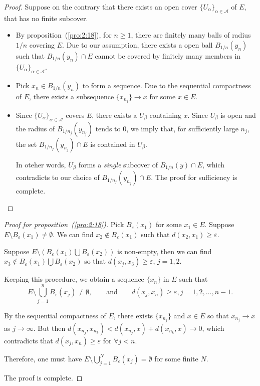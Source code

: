 \begin{proof}
Suppose on the contrary that there exists an open cover $\{U_\alpha\}_{\alpha\in\mathcal{A}}$ of $E$, that has no finite subcover.
\begin{itemize}
\item
By proposition~(\ref{pro:2:18}), for $n\ge1$, there are finitely many balls of radius $1/n$ covering $E$. Due to our assumption, there exists a open ball $B_{1/n}(y_n)$ such that $B_{1/n}(y_n)\cap E$ cannot be covered by finitely many members in $\{U_\alpha\}_{\alpha\in\mathcal{A}}$.
\item
Pick $x_n\in B_{1/n}(y_n)$ to form a sequence. Due to the sequential compactness of $E$, there exists a subsequence $\{x_{n_j}\}\to x$ for some $x\in E$. 
\item
Since $\{U_\alpha\}_{\alpha\in\mathcal{A}}$ covers $E$, there exists a $U_\beta$ containing $x$.
Since $U_\beta$ is open and the radius of $B_{1/n_j}(y_{n_j})$ tends to 0, we imply that,
for sufficiently large $n_j$, the set $B_{1/n_j}(y_{n_j})\cap E$ is contained in $U_\beta$.

In oteher words, $U_\beta$ forms a \emph{single} subcover of $B_{1/n}(y)\cap E$, which contradicts to our choice of $B_{1/n_j}(y_{n_j})\cap E$. 
The proof for sufficiency is complete.
\end{itemize}
\end{proof}
\begin{proof}[Proof for proposition~(\ref{pro:2:18})]
Pick $B_\varepsilon(x_1)$ for some $x_1\in E$. 
Suppose $E\setminus B_\varepsilon(x_1)\ne\emptyset$.
We can find $x_2\notin B_\varepsilon(x_1)$ such that $d(x_2,x_1)\ge\varepsilon$.

Suppose $E\setminus(B_\varepsilon(x_1)\bigcup B_\varepsilon(x_2))$ is non-empty, 
then we can find $x_3\notin B_\varepsilon(x_1)\bigcup B_\varepsilon(x_2)$ 
so that $d(x_j,x_3)\ge\varepsilon$, $j=1,2$.

Keeping this procedure, we obtain a sequence $\{x_n\}$ in $E$ such that
\[
E\setminus\bigcup_{j=1}^nB_\varepsilon(x_j)\ne\emptyset,
\qquad
\text{and}
\qquad
d(x_j,x_n)\ge\varepsilon,j=1,2,\dots,n-1.
\]

By the sequential compactness of $E$, 
there exists $\{x_{n_j}\}$ and $x\in E$ so that $x_{n_j}\to x$ as $j\to\infty$.
But then $d(x_{n_j},x_{n_k})<d(x_{n_j},x)+d(x_{n_k},x)\to0$, 
which contradicts that $d(x_j,x_n)\ge\varepsilon$ for $\forall j<n$.

Therefore, one must have 
$E\setminus \bigcup_{j=1}^NB_\varepsilon(x_j)=\emptyset$ for some finite $N$. 

The proof is complete.
\end{proof}

